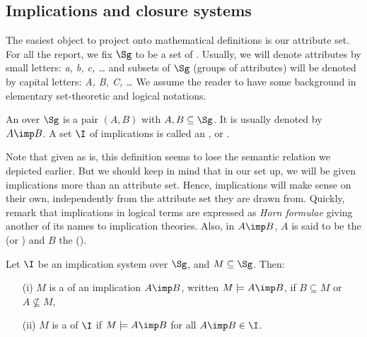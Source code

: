 
\subsection{Implications and closure systems}

The easiest object to project onto mathematical definitions is our attribute
set. For all the report, we fix $\Sg$ to be a set of . 
Usually, we will denote attributes by small letters: \textit{a, b, c, \dots} 
and subsets of $\Sg$ (groups of attributes) will be denoted by capital letters: 
\textit{A, B, C, \dots} We assume the reader to have some background in 
elementary set-theoretic and logical notations. 

\begin{definition} An 
 over $\Sg$ is a pair $(A, B)$ with $A, B \subseteq \Sg$. 
It is usually denoted by $A \imp B$. A set $\I$ of implications is called an 
,  or 
.
\end{definition}

\noindent Note that given as is, this definition seems to lose the semantic
relation we depicted earlier. But we should keep in mind that in our set up, we
will be given implications more than an attribute set. Hence, implications will
make sense on their own, independently from the attribute set they are drawn 
from. Quickly, remark that implications in logical terms are expressed as
\textit{Horn formulae} giving another of its names to implication theories. 
Also, in $A \imp B$, $A$ is said to be the  (or ) 
and $B$ the  ().

\begin{definition} Let $\I$ be an implication system over 
	$\Sg$, and $M \subseteq \Sg$. Then:
	\begin{itemize}
		\item[(i)] $M$ is a  of an implication $A \imp B$, 
		written 
		$M \models A \imp B$, if $B \subseteq M$ or $A \nsubseteq M$,
		\item[(ii)] $M$ is a  of $\I$ if $M \models A \imp B$ for 
		all
		$A \imp B \in \I$.
	\end{itemize}
	
\end{definition}

